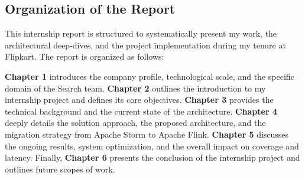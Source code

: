 \subsection{Organization of the Report}
\begin{justify}
    This internship report is structured to systematically present my work, the architectural deep-dives, and the project implementation during my tenure at Flipkart. The report is organized as follows:
    
    \textbf{Chapter 1} introduces the company profile, technological scale, and the specific domain of the Search team. \textbf{Chapter 2} outlines the introduction to my internship project and defines its core objectives. \textbf{Chapter 3} provides the technical background and the current state of the architecture. \textbf{Chapter 4} deeply details the solution approach, the proposed architecture, and the migration strategy from Apache Storm to Apache Flink. \textbf{Chapter 5} discusses the ongoing results, system optimization, and the overall impact on coverage and latency. Finally, \textbf{Chapter 6} presents the conclusion of the internship project and outlines future scopes of work.
\end{justify}